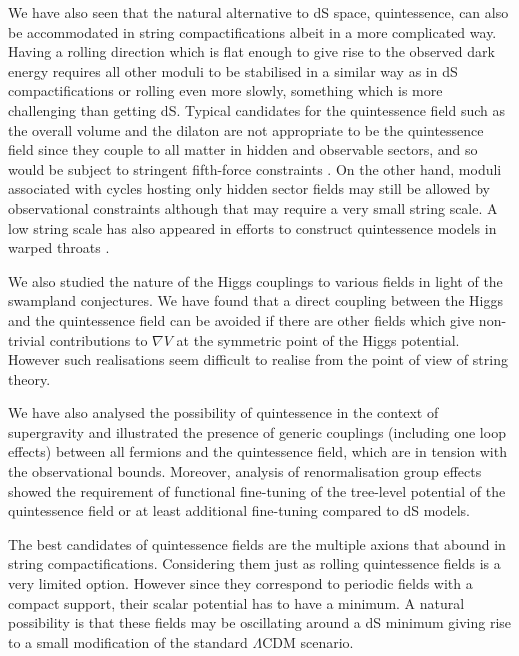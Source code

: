 \documentclass[11pt,a4paper]{article}
\begin{document}
\begin{itemize}
We have also seen that the natural alternative to dS space, quintessence, can also be accommodated in string compactifications albeit in a more complicated way. Having a rolling direction which is flat enough to give rise to the observed dark energy requires all other moduli to be stabilised in a similar way as in dS compactifications or rolling even more slowly, something which is more challenging than getting dS. Typical candidates for the quintessence field such as the overall volume and the dilaton are not appropriate to be the quintessence field since they couple to all matter in hidden and observable sectors, and so would be subject to stringent fifth-force constraints \cite{Adelberger:2003zx}. On the other hand, moduli associated with cycles hosting only hidden sector fields \cite{Cicoli:2012tz} may still be allowed by observational constraints although that may require a very small string scale. A low string scale has also appeared in efforts to construct quintessence models in warped throats \cite{Panda:2010uq}.

We also studied the nature of the Higgs couplings to various fields in light of the swampland conjectures. We have found that a direct coupling between the Higgs and the quintessence field can be avoided if there are other fields which give non-trivial contributions to $\nabla V$ at the symmetric point of the Higgs potential. However such realisations seem difficult to realise from the point of view of string theory. 

We have also analysed the possibility of quintessence in the context of supergravity and illustrated the presence of generic couplings (including one loop effects) between all fermions and the quintessence field, which are in tension with the observational bounds. Moreover, analysis of renormalisation group effects showed the requirement of functional fine-tuning of the tree-level potential of the quintessence field or at least additional fine-tuning compared to dS models.

The best candidates of quintessence fields are the multiple axions that abound in string compactifications. Considering them just as rolling quintessence fields is a very limited option. However since they correspond to periodic fields with a compact support, their scalar potential has to have a minimum. A natural possibility is that these fields may be oscillating around a dS minimum giving rise to a small modification of the standard $\Lambda$CDM scenario.  


\end{itemize}
\end{document}
